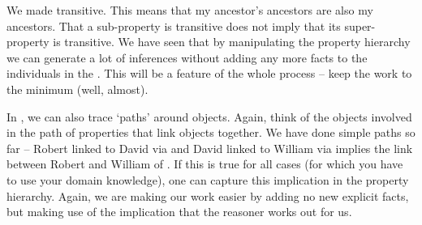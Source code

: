 We made  transitive. This means that my ancestor's ancestors are also my ancestors. That a sub-property is transitive does not imply that its super-property is transitive. We have seen that by manipulating the property hierarchy we can generate a lot of inferences without adding any more facts to the individuals in the \fhkb. This will be a feature of the whole process -- keep the work to the minimum (well, almost).

In \owlii, we can also trace `paths' around objects. Again, think of the objects involved in the path of properties that link objects together. We have done simple paths so far -- Robert linked to David via  and David linked to William via  implies the link between Robert and William of . If this is true for all cases (for which you have to use your domain knowledge), one can capture this implication in the property hierarchy. Again, we are making our work easier by adding no new explicit facts, but making use of the implication that the reasoner works out for us.


